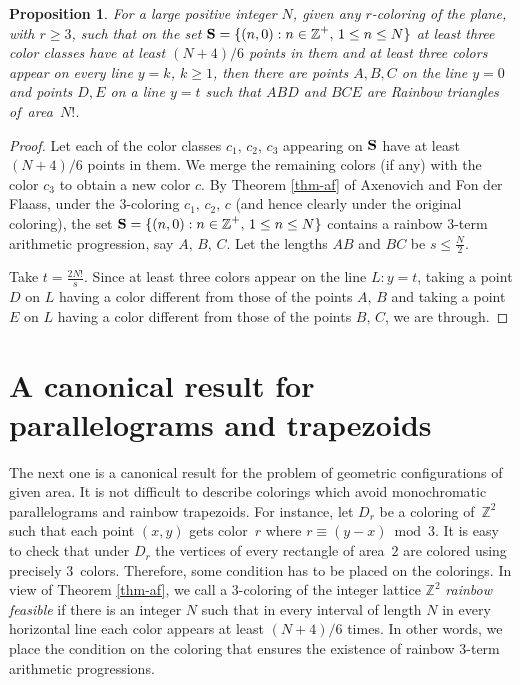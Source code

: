 \documentclass[a4paper, 11pt,reqno]{amsart}
\newtheorem{proposition}{Proposition}
\theoremstyle{definition}
\newcommand{\Z}{\mbox{${\mathbb Z}$}}
\begin{document}
\begin{proposition}
For a large positive integer $N$, given any $r$-coloring of the plane, with $r \geq 3$, such that on the
set ${\bf S}= \{(n,0): n \in \Z^+,\, 1 \leq n \leq N\}$ at least three color classes have
at least $(N+4)/6$ points in  them and at least three colors appear on every line $y=k$, $k \geq 1$,
then there are points $A,B,C$ on the line $y=0$ and points $D,E$ on a line $y=t$ such that $ABD$ and $BCE$
are Rainbow triangles of~area~$N!$.
\end{proposition}

\begin{proof}
Let each of the color classes  $c_1,\,c_2,\,c_3$ appearing on ${\bf S}$ have at least $(N+4)/6$ points in  them.
We merge the remaining colors (if any) with the color $c_3$ to obtain a new color $c$.
By Theorem \ref{thm-af} of Axenovich and Fon der Flaass, under the $3$-coloring $c_1,\,c_2,\,c$ (and hence clearly under the
original coloring), the set ${\bf S}= \{(n,0): n \in \Z^+,\, 1 \leq n \leq N\}$ contains a rainbow
$3$-term arithmetic progression, say $A,\,B,\,C$. Let the lengths $AB$ and $BC$ be $s\leq \frac{N}{2}$.

Take $t=\frac{2N!}{s}$. Since at least three colors appear on  the line $L:y=t$, taking a point $D$ on $L$
having a color different from those of the points $A,\,B$ and taking a point $E$ on $L$
having a color different from those of the points $B,\,C$, we are through.
\end{proof}

\section{A canonical result for parallelograms and trapezoids}

{The next one is a canonical result for the problem of geometric configurations of given area. It is not difficult to
describe colorings which avoid monochromatic parallelograms and rainbow trapezoids. {For instance, let $D_r$ be a coloring of~$\Z^2$ such that each point $(x,y)$ gets color~$r$ where $r\equiv (y-x)\bmod 3$.
 It is easy to check that under $D_r$ the vertices of every rectangle of area~$2$ are colored using precisely $3$~colors.}
Therefore,  some condition has to be placed on the colorings.
  In view of Theorem \ref{thm-af},  we call a $3$-coloring of the integer lattice $\Z^2$ \emph{rainbow
feasible} if there is
an integer $N$ such that in every interval of length $N$ in every horizontal line each color appears at least $(N+4)/6$
times. In other words, we place the condition on the coloring that ensures the existence of rainbow $3$-term arithmetic
progressions.}
\end{document}
